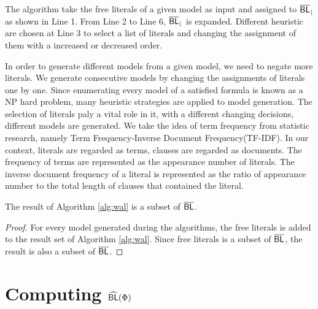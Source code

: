 The algorithm take the free literals of a given model as input and assigned to ${\sf \overline{BL}_\downharpoonright}$ as shown in Line 1. From Line 2 to Line 6, ${\sf \overline{BL}_\downharpoonright}$ is expanded. Different heuristic are chosen at Line 3 to select a list of literals and changing the assignment of them with a increased or decreased order.

In order to generate different models from a given model, we need to negate more literals. We generate consecutive models by changing the assignments of literals one by one. Since enumerating every model of a satisfied formula is known as a NP hard problem, many heuristic strategies are applied to model generation. The selection of literals paly a vital role in it, with a different changing decisions, different models are generated. We take the idea of term frequency from statistic research, namely Term Frequency-Inverse Document Frequency(TF-IDF). In our context, literals are regarded as terms, clauses are regarded as documents. The frequency of terms are represented as the appearance number of literals. The inverse document frequency of a literal is represented as the ratio of appearance number to the total length of clauses that contained the literal.

\begin{lemma}
The result of Algorithm \ref{alg:wal} is a subset of $\overline{\textsf{BL}}$.
\end{lemma}
\begin{proof}
For every model generated during the algorithms, the free literals is added to the result set of Algorithm \ref{alg:wal}.
Since free literals is a subset of $\overline{\textsf{BL}}$, the result is also a subset of $\overline{\textsf{BL}}$.
\end{proof}


\section{Computing ${\sf \widehat{BL}}(\Phi)$}

